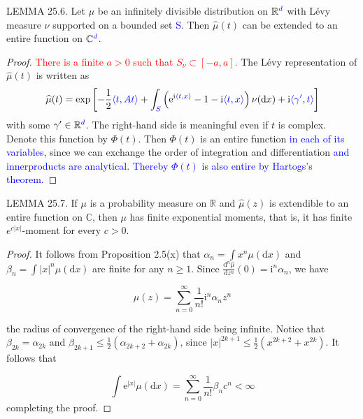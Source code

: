 \documentclass[a4paper,11pt]{article}
\begin{document}
LEMMA 25.6. Let $\mu$ be an infinitely divisible distribution on $\mathbb{R} \textcolor{blue}{^{d}}$ with Lévy measure $\nu$
supported on a bounded set \textcolor{blue}{S}. Then $\widehat{\mu}(t)$ can be extended to an entire function on $\mathbb{C}\textcolor{blue}{^{d}}$.

\begin{proof}
    \textcolor{red}{There is a finite $a>0$ such that $S_{\nu} \subset[-a, a]$.} The Lévy representation of $\widehat{\mu}(t)$ is written as
    $$
        \widehat{\mu}(t)=\exp \left[-\frac{1}{2} \textcolor{blue}{\langle t, At \rangle} +\int_{\textcolor{blue}{S}}\left(\mathrm{e}^{\mathrm{i} \textcolor{blue}{\langle t, x \rangle}}-1-\mathrm{i} \textcolor{blue}{\langle t, x \rangle}\right) \nu(\mathrm{d} x)+\mathrm{i} \textcolor{blue}{\langle \gamma', t \rangle}\right]
    $$
    with some $\gamma^{\prime} \in \mathbb{R}\textcolor{blue}{^{d}}$. The right-hand side is meaningful even if $t$ is complex. Denote
    this function by $\Phi(t)$. Then $\Phi(t)$ is an entire function \textcolor{blue}{in each of its variables}, since we can exchange the order of integration and differentiation \textcolor{blue}{and innerproducts are analytical}.
    \textcolor{blue}{Thereby $\Phi(t)$ is also entire by Hartogs's theorem.}
\end{proof}


LEMMA 25.7. If $\mu$ is a probability measure on $\mathbb{R}$ and $\widehat{\mu}(z)$ is extendible to an entire
function on $\mathbb{C}$, then $\mu$ has finite exponential moments, that is, it has finite $e^{c|x|}$-moment for every $c>0$.

\begin{proof}
    It follows from Proposition 2.5(x) that $\alpha_{n}=\int x^{n} \mu(\mathrm{d} x)$ and
    $\beta_{n}=\int|x|^{n} \mu(\mathrm{d} x)$ are finite for any $n \geq 1$. Since
    $\frac{\mathrm{d}^{n} \widehat{\mu}}{\mathrm{d} z^{n}}(0)=\mathrm{i}^{n} \alpha_{n}$, we have

    $$
        \widehat{\mu}(z)=\sum_{n=0}^{\infty} \frac{1}{n !} \mathrm{i}^{n} \alpha_{n} z^{n}
    $$

    the radius of convergence of the right-hand side being infinite. Notice that $\beta_{2 k}=\alpha_{2 k}$ and
    $\beta_{2 k+1} \leq \frac{1}{2}\left(\alpha_{2 k+2}+\alpha_{2 k}\right)$, since
    $|x|^{2 k+1} \leq \frac{1}{2}\left(x^{2 k+2}+x^{2 k}\right)$. It follows that

    $$
        \int \mathrm{e}^{|x|} \mu(\mathrm{d} x)=\sum_{n=0}^{\infty} \frac{1}{n !} \beta_{n} c^{n}<\infty
    $$
    completing the proof.

\end{proof}
\end{document}
